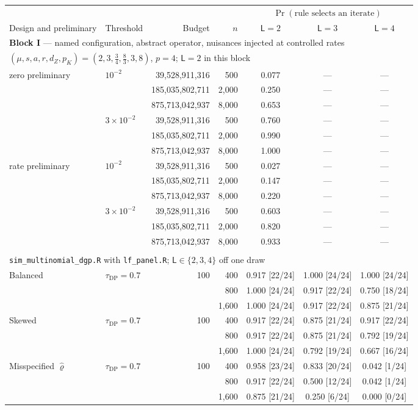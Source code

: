 \begin{tabular}{llrrccc}
\toprule
& & & & \multicolumn{3}{c}{$\Pr(\text{rule selects an iterate})$} \\
\cmidrule(lr){5-7}
Design and preliminary & Threshold & Budget & $n$ & $\mathsf L=2$ & $\mathsf L=3$ & $\mathsf L=4$ \\
\midrule
\multicolumn{7}{l}{\textbf{Block I} --- named configuration, abstract operator, nuisances injected at controlled rates} \\
\multicolumn{7}{l}{\quad $(\mu,s,a,r,d_Z,p_K)=(2,3,\tfrac34,\tfrac83,3,8)$, $p=4$; $\mathsf L=2$ in this block} \\
\midrule
zero preliminary & $10^{-2}$ & 39,528,911,316 & 500 & 0.077 & --- & --- \\
 &  & 185,035,802,711 & 2,000 & 0.250 & --- & --- \\
 &  & 875,713,042,937 & 8,000 & 0.653 & --- & --- \\
 & $3\times10^{-2}$ & 39,528,911,316 & 500 & 0.760 & --- & --- \\
 &  & 185,035,802,711 & 2,000 & 0.990 & --- & --- \\
 &  & 875,713,042,937 & 8,000 & 1.000 & --- & --- \\
\addlinespace
rate preliminary & $10^{-2}$ & 39,528,911,316 & 500 & 0.027 & --- & --- \\
 &  & 185,035,802,711 & 2,000 & 0.147 & --- & --- \\
 &  & 875,713,042,937 & 8,000 & 0.220 & --- & --- \\
 & $3\times10^{-2}$ & 39,528,911,316 & 500 & 0.603 & --- & --- \\
 &  & 185,035,802,711 & 2,000 & 0.820 & --- & --- \\
 &  & 875,713,042,937 & 8,000 & 0.933 & --- & --- \\
\addlinespace
\multicolumn{7}{l}{\textbf{Block III} --- multinomial design, shipped engine, nuisances estimated} \\
\multicolumn{7}{l}{\quad \texttt{sim\_multinomial\_dgp.R} with \texttt{lf\_panel.R}; $\mathsf L\in\{2,3,4\}$ off one draw} \\
\midrule
Balanced & $\tau_{\mathrm{DP}}=0.7$ & 100 & 400 & 0.917 [22/24] & 1.000 [24/24] & 1.000 [24/24] \\
 &  &  & 800 & 1.000 [24/24] & 0.917 [22/24] & 0.750 [18/24] \\
 &  &  & 1,600 & 1.000 [24/24] & 0.917 [22/24] & 0.875 [21/24] \\
\addlinespace
Skewed & $\tau_{\mathrm{DP}}=0.7$ & 100 & 400 & 0.917 [22/24] & 0.875 [21/24] & 0.917 [22/24] \\
 &  &  & 800 & 0.917 [22/24] & 0.875 [21/24] & 0.792 [19/24] \\
 &  &  & 1,600 & 1.000 [24/24] & 0.792 [19/24] & 0.667 [16/24] \\
\addlinespace
Misspecified $\hat\varrho$ & $\tau_{\mathrm{DP}}=0.7$ & 100 & 400 & 0.958 [23/24] & 0.833 [20/24] & 0.042 [1/24] \\
 &  &  & 800 & 0.917 [22/24] & 0.500 [12/24] & 0.042 [1/24] \\
 &  &  & 1,600 & 0.875 [21/24] & 0.250 [6/24] & 0.000 [0/24] \\
\bottomrule
\end{tabular}
